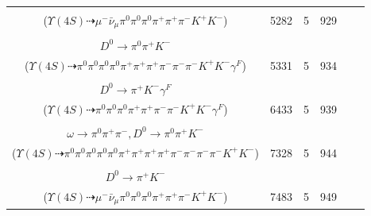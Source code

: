 \documentclass[landscape]{article}
\newcounter{rownumbers}
\newcommand\rn{\stepcounter{rownumbers}\arabic{rownumbers}}
\newcommand{\EOLP}{\\ \hline} %
\newcommand{\topoTags}[1]{#1} %
\begin{document}
\begin{longtable}{clcccc}
\rn & \makecell[l]{ $ 
\Upsilon(4S) \rightarrow B^{+} B^{-} ,
B^{+} \rightarrow \rho^{+} \bar{D}^{0} ,
B^{-} \rightarrow \mu^{-} \bar{\nu}_{\mu} D^{0} ,
\rho^{+} \rightarrow \pi^{0} \pi^{+} ,
\bar{D}^{0} \rightarrow \pi^{-} K^{+} ,
D^{0} \rightarrow \pi^{0} \pi^{0} \pi^{+} K^{-} 
$ \\ ($
\Upsilon(4S) \dashrightarrow \mu^{-} \bar{\nu}_{\mu} \pi^{0} \pi^{0} \pi^{0} \pi^{+} \pi^{+} \pi^{-} K^{+} K^{-} 
$) } & \topoTags{5282 & }5 & 929 \EOLP

\rn & \makecell[l]{ $ 
\Upsilon(4S) \rightarrow B^{+} B^{-} ,
B^{+} \rightarrow \rho^{+} \bar{D}^{0} ,
B^{-} \rightarrow \pi^{0} \pi^{+} \pi^{-} \pi^{-} D^{*0} \gamma^{F} ,
\rho^{+} \rightarrow \pi^{0} \pi^{+} ,
\bar{D}^{0} \rightarrow \pi^{-} K^{+} ,
D^{*0} \rightarrow \pi^{0} D^{0} ,
$ \\ $
D^{0} \rightarrow \pi^{0} \pi^{+} K^{-} 
$ \\ ($
\Upsilon(4S) \dashrightarrow \pi^{0} \pi^{0} \pi^{0} \pi^{0} \pi^{+} \pi^{+} \pi^{+} \pi^{-} \pi^{-} \pi^{-} K^{+} K^{-} \gamma^{F} 
$) } & \topoTags{5331 & }5 & 934 \EOLP

\rn & \makecell[l]{ $ 
\Upsilon(4S) \rightarrow B^{+} B^{-} ,
B^{+} \rightarrow \rho^{+} \bar{D}^{0} ,
B^{-} \rightarrow \rho^{-} D^{0} ,
\rho^{+} \rightarrow \pi^{0} \pi^{+} ,
\bar{D}^{0} \rightarrow \pi^{0} \pi^{-} K^{+} ,
\rho^{-} \rightarrow \pi^{0} \pi^{-} ,
$ \\ $
D^{0} \rightarrow \pi^{+} K^{-} \gamma^{F} 
$ \\ ($
\Upsilon(4S) \dashrightarrow \pi^{0} \pi^{0} \pi^{0} \pi^{+} \pi^{+} \pi^{-} \pi^{-} K^{+} K^{-} \gamma^{F} 
$) } & \topoTags{6433 & }5 & 939 \EOLP

\rn & \makecell[l]{ $ 
\Upsilon(4S) \rightarrow B^{+} B^{-} ,
B^{+} \rightarrow \rho^{+} \bar{D}^{0} ,
B^{-} \rightarrow \pi^{-} \omega \omega D^{0} ,
\rho^{+} \rightarrow \pi^{0} \pi^{+} ,
\bar{D}^{0} \rightarrow \pi^{0} \pi^{-} K^{+} ,
\omega \rightarrow \pi^{0} \pi^{+} \pi^{-} ,
$ \\ $
\omega \rightarrow \pi^{0} \pi^{+} \pi^{-} ,
D^{0} \rightarrow \pi^{0} \pi^{+} K^{-} 
$ \\ ($
\Upsilon(4S) \dashrightarrow \pi^{0} \pi^{0} \pi^{0} \pi^{0} \pi^{0} \pi^{+} \pi^{+} \pi^{+} \pi^{+} \pi^{-} \pi^{-} \pi^{-} \pi^{-} K^{+} K^{-} 
$) } & \topoTags{7328 & }5 & 944 \EOLP

\rn & \makecell[l]{ $ 
\Upsilon(4S) \rightarrow B^{+} B^{-} ,
B^{+} \rightarrow \rho^{+} \bar{D}^{0} ,
B^{-} \rightarrow \mu^{-} \bar{\nu}_{\mu} D^{*0} ,
\rho^{+} \rightarrow \pi^{0} \pi^{+} ,
\bar{D}^{0} \rightarrow \pi^{0} \pi^{-} K^{+} ,
D^{*0} \rightarrow \pi^{0} D^{0} ,
$ \\ $
D^{0} \rightarrow \pi^{+} K^{-} 
$ \\ ($
\Upsilon(4S) \dashrightarrow \mu^{-} \bar{\nu}_{\mu} \pi^{0} \pi^{0} \pi^{0} \pi^{+} \pi^{+} \pi^{-} K^{+} K^{-} 
$) } & \topoTags{7483 & }5 & 949 \EOLP


\end{longtable}
\end{document}

